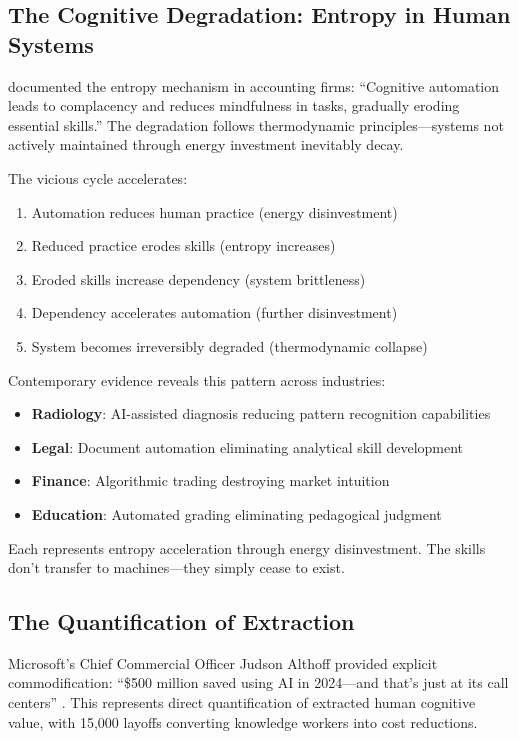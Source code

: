 \subsection{The Cognitive Degradation: Entropy in Human Systems}

\citet{rintakahila2023} documented the entropy mechanism in accounting firms: ``Cognitive automation leads to complacency and reduces mindfulness in tasks, gradually eroding essential skills.'' The degradation follows thermodynamic principles---systems not actively maintained through energy investment inevitably decay.

The vicious cycle accelerates:
\begin{enumerate}
\item Automation reduces human practice (energy disinvestment)
\item Reduced practice erodes skills (entropy increases)
\item Eroded skills increase dependency (system brittleness)
\item Dependency accelerates automation (further disinvestment)
\item System becomes irreversibly degraded (thermodynamic collapse)
\end{enumerate}

Contemporary evidence reveals this pattern across industries:
\begin{itemize}
\item \textbf{Radiology}: AI-assisted diagnosis reducing pattern recognition capabilities
\item \textbf{Legal}: Document automation eliminating analytical skill development
\item \textbf{Finance}: Algorithmic trading destroying market intuition
\item \textbf{Education}: Automated grading eliminating pedagogical judgment
\end{itemize}

Each represents entropy acceleration through energy disinvestment. The skills don't transfer to machines---they simply cease to exist.

\subsection{The Quantification of Extraction}

Microsoft's Chief Commercial Officer Judson Althoff provided explicit commodification: ``\$500 million saved using AI in 2024---and that's just at its call centers'' \citep{althoff2024}. This represents direct quantification of extracted human cognitive value, with 15,000 layoffs converting knowledge workers into cost reductions.


